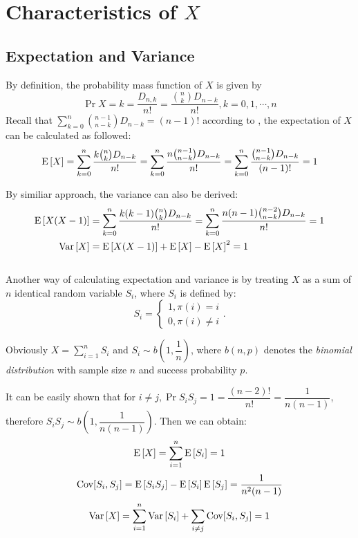 
\section{Characteristics of $ X$}
\subsection{Expectation and Variance}
\label{f-random}
By definition, the probability mass function of $ X$ is given by
  \begin{equation}
  \Pr{X=k} = \dfrac{D_{n,k}}{n!}=\dfrac{{n\choose{k}}D_{n-k}}{n!}, k = 0,1,\cdots ,n
  \label{eqn:f-pr}
  \end{equation}
Recall that $ \sum_{k=0}^n{n-1 \choose{n-k}}D_{n-k}=(n-1)!$ according to ,
the expectation of $ X$ can be calculated as followed:
\begin{equation}
 \E{X} = \sum_{k=0}^n\dfrac{k{n\choose{k}}D_{n-k}}{n!} = \sum_{k=0}^n\dfrac{n{n-1\choose{n-k}}D_{n-k}}{n!} =
  \sum_{k=0}^n\dfrac{{n-1\choose{n-k}}D_{n-k}}{(n-1)!} = 1
  \label{eqn:exp1}
  \end{equation}

By similiar approach, the variance can also be derived:
\begin{align}
 \E{X(X-1)} &= \sum_{k=0}^n\dfrac{k(k-1){n\choose k}D_{n-k}}{n!}=\sum_{k=0}^n\dfrac{n(n-1){n-2 \choose{n-k}}D_{n-k}}{n!} = 1 \label{eqn:exp2} \\
 \Var{X} &= \E{X(X-1)} + \E{X}-\E{X}^2 = 1 \nonumber
\end{align}
\\

Another way of calculating expectation and variance is by treating $ X$ as a sum of $ n $ identical
random variable $ S_i$, where $ S_i$ is defined by:
\[ S_i = \begin{cases}1, \pi(i)=i\\0,\pi(i)\neq i\end{cases}.\]

Obviously $ X = \sum_{i=1}^nS_i$ and $ S_i\sim b(1,\dfrac{1}{n})$, where $ b(n,p)$ denotes the
\emph{binomial distribution} with sample size $ n$ and success probability $ p$.

It can be easily shown that for $ i\neq j, \Pr{S_iS_j=1}=\dfrac{(n-2)!}{n!}=\dfrac{1}{n(n-1)} $, therefore $S_iS_j \sim b(1, \dfrac{1}{n(n-1)})$.
Then we can obtain:
\[ \E{X} = \sum_{i=1}^n\E{S_i} = 1\]
\[ \operatorname{Cov}[S_i,S_j]=\text{E}\left[S_iS_j\right]-\text{E}\left[S_i\right]\text{E}\left[S_j\right]=\dfrac{1}{n^2(n-1)}\]
\[ \Var{X} = \sum_{i=1}^n\Var{S_i}+\sum_{i\neq j}\Cov[S_i,S_j] = 1\]

